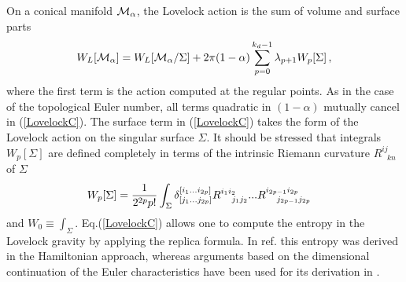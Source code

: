 \documentclass[12pt]{article}
\begin{document}
On a conical manifold ${\cal M}_{\alpha}$, the Lovelock action is
 the sum of  volume and surface parts \cite{Fursaev:1995ef}
\begin{equation}
W_L[{\cal M}_{\alpha}]= W_L[{\cal M}_{\alpha}/\Sigma] + 2\pi (1-\alpha)
\sum_{p=0}^{k_d-1} \lambda _{p+1} W_{p}[\Sigma]\, ,
\label{LovelockC}
\end{equation}
where the first term is the action computed at the regular points. As in the case of the topological Euler number, all terms quadratic in $(1-\alpha)$ mutually cancel in
(\ref{LovelockC}). The surface term in (\ref{LovelockC}) takes the form of
the Lovelock action  on the singular surface $\Sigma$.
It should be stressed that integrals $W_{p}[\Sigma]$ are defined completely
in terms of the intrinsic Riemann curvature $R^{ij}_{\ \ \ kn}$ of $\Sigma$
\begin{equation}
W_p[\Sigma]={1 \over 2^{2p} p!}\int_{\Sigma}\delta^{[i_1...i_{2p}]}
_{[j_1...j_{2p}]}R^{i_1i_2}_{\ \ \ j_1j_2}...R^{i_{2p-1}i_{2p}}_{\ \ \ j_{2p-1}
j_{2p}}~~~
\label{W_p}
\end{equation}
and $W_0\equiv \int_{\Sigma}$.   Eq.(\ref{LovelockC}) allows one to compute the entropy in the Lovelock gravity by applying the replica formula. In ref.\cite{Jacobson:1993xs} this entropy was derived in the Hamiltonian approach, whereas arguments based on the
dimensional continuation of the Euler characteristics have been used for its derivation in \cite{Banados:1993qp}.
\end{document}
